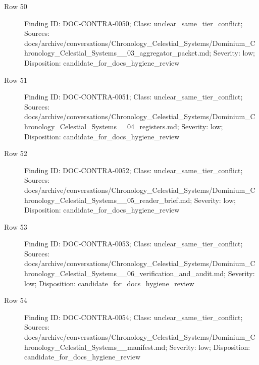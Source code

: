 \documentclass[9pt,a4paper]{book}
\begin{document}
\begin{description}
\item[Row 50] Finding ID: DOC-\allowbreak{}CONTRA-\allowbreak{}0050; Class: unclear\_\allowbreak{}same\_\allowbreak{}tier\_\allowbreak{}conflict; Sources: docs/\allowbreak{}archive/\allowbreak{}conversations/\allowbreak{}Chronology\_\allowbreak{}Celestial\_\allowbreak{}Systems/\allowbreak{}Dominium\_\allowbreak{}Chronology\_\allowbreak{}Celestial\_\allowbreak{}Systems\_\allowbreak{}\_\allowbreak{}03\_\allowbreak{}aggregator\_\allowbreak{}packet.\allowbreak{}md; Severity: low; Disposition: candidate\_\allowbreak{}for\_\allowbreak{}docs\_\allowbreak{}hygiene\_\allowbreak{}review
\item[Row 51] Finding ID: DOC-\allowbreak{}CONTRA-\allowbreak{}0051; Class: unclear\_\allowbreak{}same\_\allowbreak{}tier\_\allowbreak{}conflict; Sources: docs/\allowbreak{}archive/\allowbreak{}conversations/\allowbreak{}Chronology\_\allowbreak{}Celestial\_\allowbreak{}Systems/\allowbreak{}Dominium\_\allowbreak{}Chronology\_\allowbreak{}Celestial\_\allowbreak{}Systems\_\allowbreak{}\_\allowbreak{}04\_\allowbreak{}registers.\allowbreak{}md; Severity: low; Disposition: candidate\_\allowbreak{}for\_\allowbreak{}docs\_\allowbreak{}hygiene\_\allowbreak{}review
\item[Row 52] Finding ID: DOC-\allowbreak{}CONTRA-\allowbreak{}0052; Class: unclear\_\allowbreak{}same\_\allowbreak{}tier\_\allowbreak{}conflict; Sources: docs/\allowbreak{}archive/\allowbreak{}conversations/\allowbreak{}Chronology\_\allowbreak{}Celestial\_\allowbreak{}Systems/\allowbreak{}Dominium\_\allowbreak{}Chronology\_\allowbreak{}Celestial\_\allowbreak{}Systems\_\allowbreak{}\_\allowbreak{}05\_\allowbreak{}reader\_\allowbreak{}brief.\allowbreak{}md; Severity: low; Disposition: candidate\_\allowbreak{}for\_\allowbreak{}docs\_\allowbreak{}hygiene\_\allowbreak{}review
\item[Row 53] Finding ID: DOC-\allowbreak{}CONTRA-\allowbreak{}0053; Class: unclear\_\allowbreak{}same\_\allowbreak{}tier\_\allowbreak{}conflict; Sources: docs/\allowbreak{}archive/\allowbreak{}conversations/\allowbreak{}Chronology\_\allowbreak{}Celestial\_\allowbreak{}Systems/\allowbreak{}Dominium\_\allowbreak{}Chronology\_\allowbreak{}Celestial\_\allowbreak{}Systems\_\allowbreak{}\_\allowbreak{}06\_\allowbreak{}verification\_\allowbreak{}and\_\allowbreak{}audit.\allowbreak{}md; Severity: low; Disposition: candidate\_\allowbreak{}for\_\allowbreak{}docs\_\allowbreak{}hygiene\_\allowbreak{}review
\item[Row 54] Finding ID: DOC-\allowbreak{}CONTRA-\allowbreak{}0054; Class: unclear\_\allowbreak{}same\_\allowbreak{}tier\_\allowbreak{}conflict; Sources: docs/\allowbreak{}archive/\allowbreak{}conversations/\allowbreak{}Chronology\_\allowbreak{}Celestial\_\allowbreak{}Systems/\allowbreak{}Dominium\_\allowbreak{}Chronology\_\allowbreak{}Celestial\_\allowbreak{}Systems\_\allowbreak{}\_\allowbreak{}manifest.\allowbreak{}md; Severity: low; Disposition: candidate\_\allowbreak{}for\_\allowbreak{}docs\_\allowbreak{}hygiene\_\allowbreak{}review

\end{description}
\end{document}
